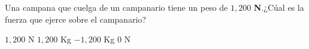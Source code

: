 
\question Una campana que cuelga de un campanario tiene un peso de $1,200$
          \textbf{N}.¿Cúal es la fuerza que ejerce sobre el campanario?

  \begin{oneparchoices}
    \CorrectChoice $1,200$ N
    \choice $1,200$ Kg
    \choice $-1,200$ Kg
    \choice $0$ N
  \end{oneparchoices}
  \answerline[A]
